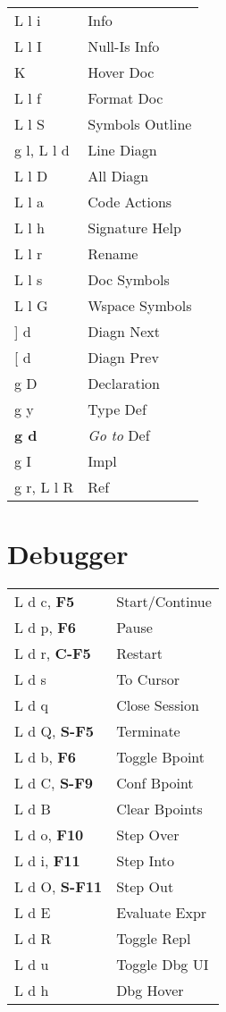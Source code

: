 \documentclass[
  ,landscape
  ,columns=4
]{cheatsheet}
\begin{document}
\begin{tabular}{ll}
	L l i        & Info               \\
	L l I        & Null-Is Info       \\
	K            & Hover Doc          \\
	L l f        & Format Doc         \\
	L l S        & Symbols Outline    \\
	g l, L l d   & Line Diagn         \\
	L l D        & All Diagn          \\
	L l a        & Code Actions       \\
	L l h        & Signature Help     \\
	L l r        & Rename             \\
	L l s        & Doc Symbols        \\
	L l G        & Wspace Symbols     \\
	{]} d        & Diagn Next         \\
	{[} d        & Diagn Prev         \\
	g D          & Declaration        \\
	g y          & Type Def           \\
	\textbf{g d} & \textit{Go to} Def \\
	g I          & Impl               \\
	g r, L l R   & Ref                \\
\end{tabular}

\section{Debugger}

\begin{tabular}{ll}
	L d c, \textbf{F5}    & Start/Continue \\
	L d p, \textbf{F6}    & Pause          \\
	L d r, \textbf{C-F5}  & Restart        \\
	L d s                 & To Cursor      \\
	L d q                 & Close Session  \\
	L d Q, \textbf{S-F5}  & Terminate      \\
	L d b, \textbf{F6}    & Toggle Bpoint  \\
	L d C, \textbf{S-F9}  & Conf Bpoint    \\
	L d B                 & Clear Bpoints  \\
	L d o, \textbf{F10}   & Step Over      \\
	L d i, \textbf{F11}   & Step Into      \\
	L d O, \textbf{S-F11} & Step Out       \\
	L d E                 & Evaluate Expr  \\
	L d R                 & Toggle Repl    \\
	L d u                 & Toggle Dbg UI  \\
	L d h                 & Dbg Hover      \\
\end{tabular}
\end{document}
